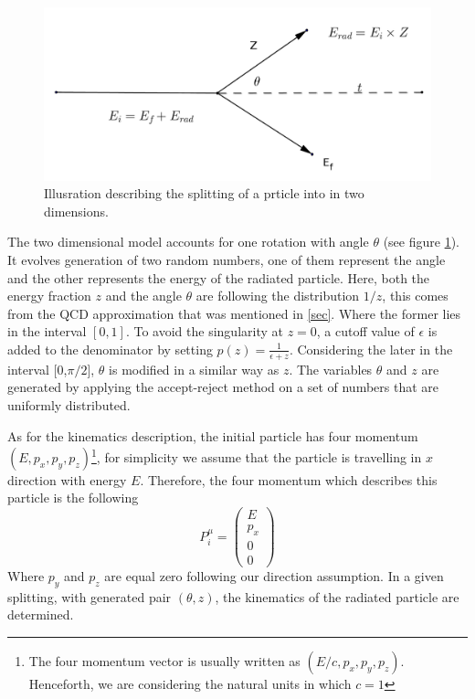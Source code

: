 \begin{figure}[hbtp]
\centering
\includegraphics[scale=.35]{images/tt.png}
\caption{Illusration describing the splitting of a prticle into in two dimensions.}\label{fig:tt}
\end{figure}

The two dimensional model accounts for one rotation with angle $\theta$ (see figure \ref{fig:tt}). It evolves
generation of two random numbers, one of them represent the angle and the other represents the energy of the radiated particle. Here, both the energy fraction $z$ and the angle $\theta$ are following the distribution $1/z$, this comes from the QCD approximation that was mentioned in \ref{sec}.
Where the former lies in the interval $[0, 1]$.
To avoid the singularity at $z = 0$, a cutoff value of $\epsilon$ is added to the denominator by setting  $p(z) = \frac{1}{\epsilon + z}$. Considering the later in the interval [0,$\pi/2$], $\theta$ is modified in a similar way as $z$. The variables $\theta$ and $z$ are generated by applying the accept-reject method on a set of numbers that are uniformly distributed.

As for the kinematics description, the initial particle has four momentum $(E, p_{x}, p_{y},p_{z})$\footnote{The four momentum vector is usually written as $(E/c, p_{x}, p_{y},p_{z})$. Henceforth, we are considering the natural units in which $c = 1$}, for simplicity we assume that the particle is travelling in $x$ direction with energy $E$. Therefore, the four momentum which describes this particle is the following 
\begin{equation}
P^{\mu}_{i}  = \begin{pmatrix}
E\\
p_x\\
0\\
0
\end{pmatrix}
\end{equation}
Where $p_y$ and $p_z$ are equal zero following our direction assumption. In a given splitting, with generated pair $(\theta, z)$, the kinematics of the radiated particle are determined.

